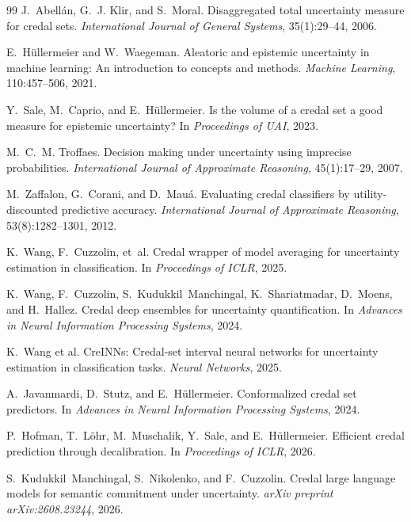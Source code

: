 \documentclass[11pt,a4paper]{article}
\begin{document}
\begin{thebibliography}{99}
J.~Abell{\'a}n, G.~J. Klir, and S.~Moral.
\newblock Disaggregated total uncertainty measure for credal sets.
\newblock \emph{International Journal of General Systems}, 35(1):29--44, 2006.

E.~H{\"u}llermeier and W.~Waegeman.
\newblock Aleatoric and epistemic uncertainty in machine learning: An introduction to concepts and methods.
\newblock \emph{Machine Learning}, 110:457--506, 2021.

Y.~Sale, M.~Caprio, and E.~H{\"u}llermeier.
\newblock Is the volume of a credal set a good measure for epistemic uncertainty?
\newblock In \emph{Proceedings of UAI}, 2023.

M.~C.~M. Troffaes.
\newblock Decision making under uncertainty using imprecise probabilities.
\newblock \emph{International Journal of Approximate Reasoning}, 45(1):17--29, 2007.

M.~Zaffalon, G.~Corani, and D.~Mau{\'a}.
\newblock Evaluating credal classifiers by utility-discounted predictive accuracy.
\newblock \emph{International Journal of Approximate Reasoning}, 53(8):1282--1301, 2012.

K.~Wang, F.~Cuzzolin, et~al.
\newblock Credal wrapper of model averaging for uncertainty estimation in classification.
\newblock In \emph{Proceedings of ICLR}, 2025.

K.~Wang, F.~Cuzzolin, S.~Kudukkil~Manchingal, K.~Shariatmadar, D.~Moens, and H.~Hallez.
\newblock Credal deep ensembles for uncertainty quantification.
\newblock In \emph{Advances in Neural Information Processing Systems}, 2024.

K.~Wang et al.
\newblock CreINNs: Credal-set interval neural networks for uncertainty estimation in classification tasks.
\newblock \emph{Neural Networks}, 2025.

A.~Javanmardi, D.~Stutz, and E.~H{\"u}llermeier.
\newblock Conformalized credal set predictors.
\newblock In \emph{Advances in Neural Information Processing Systems}, 2024.

P.~Hofman, T.~L{\"o}hr, M.~Muschalik, Y.~Sale, and E.~H{\"u}llermeier.
\newblock Efficient credal prediction through decalibration.
\newblock In \emph{Proceedings of ICLR}, 2026.

S.~Kudukkil~Manchingal, S.~Nikolenko, and F.~Cuzzolin.
\newblock Credal large language models for semantic commitment under uncertainty.
\newblock \emph{arXiv preprint arXiv:2608.23244}, 2026.


\end{thebibliography}
\end{document}
